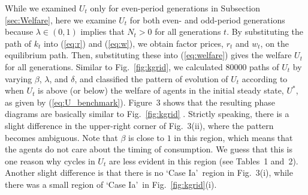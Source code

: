 \documentclass[nogrid]{MBE}%
\begin{document}
{While we examined $U_{t}$ only for even-period generations in Subsection
\ref{sec:Welfare}, here we examine $U_{t}$ for both even- and odd-period
generations because $\lambda\in(0,1)$ implies that $N_{t}>0$ for all
generations $t$. By substituting the path of $k_{t}$ into (\ref{eq:r}) and
(\ref{eq:w}), we obtain factor prices, $r_{t}$ and $w_{t}$, on the equilibrium
path. Then, substituting these into (\ref{eq:welfare}) gives the welfare
$U_{t}$ for all generations. Similar to Fig.\ \ref{fig:kgrid}, we calculated
80000 paths of $U_{t}$ by varying $\beta$, $\lambda$, and $\delta$, and
classified the pattern of evolution of $U_{t}$ according to when $U_{t}$ is
above (or below) the welfare of agents in the initial steady state, $U^{\ast}%
$, as given by (\ref{eq:U_benchmark}). Figure~3 shows that the
resulting phase diagrams are basically similar to Fig.\ \ref{fig:kgrid}%
. {Strictly speaking, there is a slight difference in the upper-right corner of Fig.~3(ii), where
the pattern becomes ambiguous. Note that $\beta$ is close to $1$ in this region, which means that
the agents do not care about the timing of consumption. We guess that this is one reason why
cycles in $U_{t}$ are less evident in this region (see Tables~1 and~2). Another slight difference
is that there is no `Case Ia'\ region in Fig.~3(i), while there was a
small region of `Case Ia'\ in Fig.\ \ref{fig:kgrid}(i). \label{fn:upper-right}%
}


}
\end{document}
